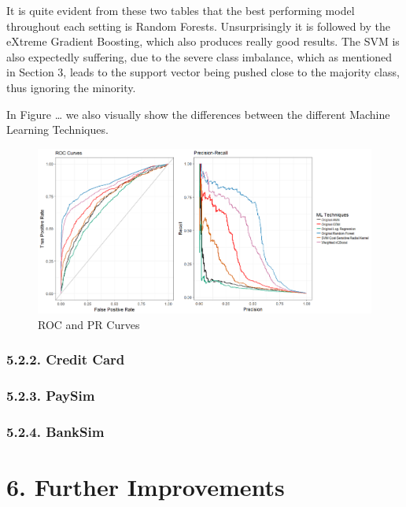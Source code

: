 \documentclass[12pt,]{article}
\begin{document}
It is quite evident from these two tables that the best performing model
throughout each setting is Random Forests. Unsurprisingly it is followed
by the eXtreme Gradient Boosting, which also produces really good
results. The SVM is also expectedly suffering, due to the severe class
imbalance, which as mentioned in Section 3, leads to the support vector
being pushed close to the majority class, thus ignoring the minority.

In Figure \ldots{} we also visually show the differences between the
different Machine Learning Techniques.

\begin{figure}
\centering
\includegraphics[width=1\textwidth,height=\textheight]{figures/ucsd/ucsd_PR_ROC.png}
\caption{ROC and PR Curves}
\end{figure}

\hypertarget{credit-card}{%
\subsubsection{5.2.2. Credit Card}\label{credit-card}}

\hypertarget{paysim-1}{%
\subsubsection{5.2.3. PaySim}\label{paysim-1}}

\hypertarget{banksim-1}{%
\subsubsection{5.2.4. BankSim}\label{banksim-1}}

\hypertarget{further-improvements}{%
\section{6. Further Improvements}\label{further-improvements}}
\end{document}
